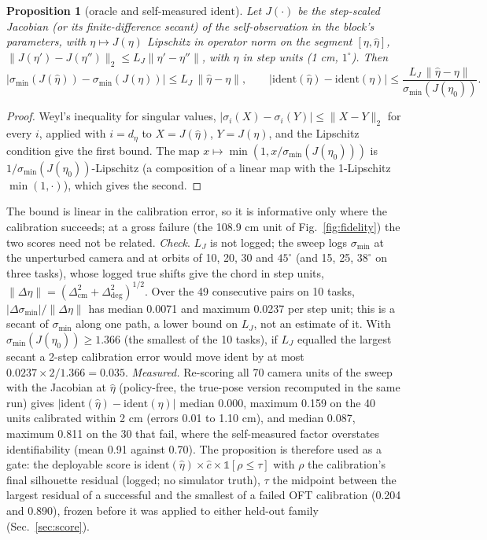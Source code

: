 \documentclass{article}
\newtheorem{proposition}{Proposition}
\newcommand{\ident}{\mathrm{ident}}
\begin{document}
\begin{proposition}[oracle and self-measured $\ident$]
\label{prop:r3oracle}
Let $J(\cdot)$ be the step-scaled Jacobian (or its finite-difference secant) of the self-observation in the block's
parameters, with $\eta \mapsto J(\eta)$ Lipschitz in operator norm on the segment $[\eta, \hat\eta]$,
$\|J(\eta') - J(\eta'')\|_2 \le L_J \|\eta' - \eta''\|$, with $\eta$ in step units (1 cm, $1^\circ$). Then
\begin{equation}
\big|\sigma_{\min}(J(\hat\eta)) - \sigma_{\min}(J(\eta))\big| \le L_J\,\|\hat\eta - \eta\|, \qquad
\big|\ident(\hat\eta) - \ident(\eta)\big| \le \frac{L_J\,\|\hat\eta - \eta\|}{\sigma_{\min}(J(\eta_0))} .
\label{eq:r3oracle}
\end{equation}
\end{proposition}
\begin{proof}
Weyl's inequality for singular values, $|\sigma_i(X) - \sigma_i(Y)| \le \|X - Y\|_2$ for every $i$, applied with
$i = d_\eta$ to $X = J(\hat\eta)$, $Y = J(\eta)$, and the Lipschitz condition give the first bound. The map $x \mapsto
\min(1, x/\sigma_{\min}(J(\eta_0)))$ is $1/\sigma_{\min}(J(\eta_0))$-Lipschitz (a composition of a linear map with the
1-Lipschitz $\min(1,\cdot)$), which gives the second.
\end{proof}
The bound is linear in the calibration error, so it is informative only where the calibration succeeds; at a gross
failure (the 108.9 cm unit of Fig.~\ref{fig:fidelity}) the two scores need not be related. \emph{Check}. $L_J$ is not
logged; the sweep logs $\sigma_{\min}$ at the unperturbed camera and at orbits of 10, 20, 30 and $45^\circ$ (and 15, 25,
$38^\circ$ on three tasks), whose logged true shifts give the chord in step units, $\|\Delta\eta\| =
(\Delta_{\mathrm{cm}}^2 + \Delta_{\mathrm{deg}}^2)^{1/2}$. Over the 49 consecutive pairs on 10 tasks,
$|\Delta\sigma_{\min}|/\|\Delta\eta\|$ has median 0.0071 and maximum 0.0237 per step unit; this is a secant of
$\sigma_{\min}$ along one path, a lower bound on $L_J$, not an estimate of it. With $\sigma_{\min}(J(\eta_0)) \ge
1.366$ (the smallest of the 10 tasks), if $L_J$ equalled the largest secant a 2-step calibration error would move
$\ident$ by at most $0.0237 \times 2/1.366 = 0.035$. \emph{Measured.} Re-scoring all 70 camera units of the sweep with
the Jacobian at $\hat\eta$ (policy-free, the true-pose version recomputed in the
same run) gives $|\ident(\hat\eta) - \ident(\eta)|$ median 0.000, maximum 0.159 on the 40 units calibrated within 2 cm
(errors 0.01 to 1.10 cm), and median 0.087, maximum 0.811 on the 30 that fail, where the self-measured factor
overstates identifiability (mean 0.91 against 0.70). The proposition is therefore used as a gate: the deployable score
is $\ident(\hat\eta) \times \hat c \times \mathbb{1}[\rho \le \tau]$ with $\rho$ the calibration's final silhouette
residual (logged; no simulator truth), $\tau$ the midpoint between the largest residual of a
successful and the smallest of a failed OFT calibration (0.204 and 0.890), frozen before it was applied to either
held-out family (Sec.~\ref{sec:score}).
\end{document}
